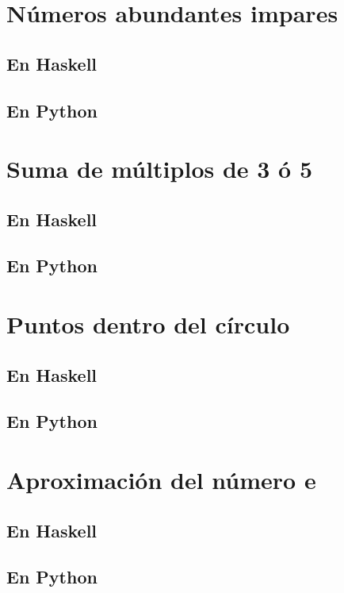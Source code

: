 \documentclass[a4paper,12pt,twoside]{book}
\begin{document}
\section{Números abundantes impares}
\subsection*{En Haskell}
\subsection*{En Python}

\section{Suma de múltiplos de 3 ó 5}
\subsection*{En Haskell}
\subsection*{En Python}

\section{Puntos dentro del círculo}
\subsection*{En Haskell}
\subsection*{En Python}

\section{Aproximación del número e}
\subsection*{En Haskell}
\subsection*{En Python}
\end{document}
